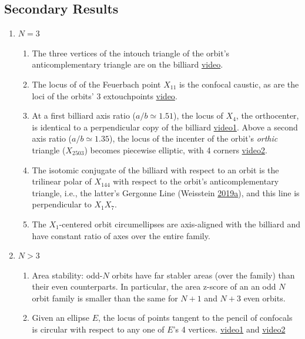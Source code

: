 \documentclass[]{article}
\providecommand{\tightlist}{%
  \setlength{\itemsep}{0pt}\setlength{\parskip}{0pt}}
\begin{document}
\hypertarget{secondary-results}{%
\subsection{Secondary Results}\label{secondary-results}}

\begin{enumerate}
\def\labelenumi{\arabic{enumi}.}
\tightlist
\item
  \(N=3\)

  \begin{enumerate}
  \def\labelenumii{\arabic{enumii}.}
  \tightlist
  \item
    The three vertices of the intouch triangle of the orbit's anticomplementary triangle are on the billiard \href{https://www.youtube.com/watch?v=50dyxWJhfN4}{video}.
  \item
    The locus of of the Feuerbach point \(X_{11}\) is the confocal caustic, as are the loci of the orbits' 3 extouchpoints \href{https://youtu.be/1gYb5Y3-rQI}{video}.
  \item
    At a first billiard axis ratio (\(a/b\simeq 1.51\)), the locus of \(X_{4}\), the orthocenter, is identical to a perpendicular copy of the billiard \href{https://youtu.be/tanxwG0LcZM}{video1}. Above a second axis ratio (\(a/b\simeq 1.35\)), the locus of the incenter of the orbit's \emph{orthic} triangle (\(X_{2503}\)) becomes piecewise elliptic, with 4 corners \href{https://youtu.be/3qJnwpFkUFQ}{video2}.
  \item
    The isotomic conjugate of the billiard with respect to an orbit is the trilinear polar of \(X_{144}\) with respect to the orbit's anticomplementary triangle, i.e., the latter's Gergonne Line (Weisstein \protect\hyperlink{ref-mw}{2019}\protect\hyperlink{ref-mw}{a}), and this line is perpendicular to \(X_1X_7\).
  \item
    The \(X_1\)-centered orbit circumellipses are axis-aligned with the billiard and have constant ratio of axes over the entire family.
  \end{enumerate}
\item
  \(N>3\)

  \begin{enumerate}
  \def\labelenumii{\arabic{enumii}.}
  \tightlist
  \item
    Area stability: odd-\(N\) orbits have far stabler areas (over the family) than their even counterparts. In particular, the area z-score of an an odd \(N\) orbit family is smaller than the same for \(N+1\) and \(N+3\) even orbits.
  \item
    Given an ellipse \(E\), the locus of points tangent to the pencil of confocals is circular with respect to any one of \(E\)'s 4 vertices. \href{https://www.youtube.com/watch?v=NsZUyDJ6IOs}{video1} and \href{https://www.youtube.com/watch?v=EL4vgcJaktc}{video2}
  \end{enumerate}
\end{enumerate}
\end{document}
